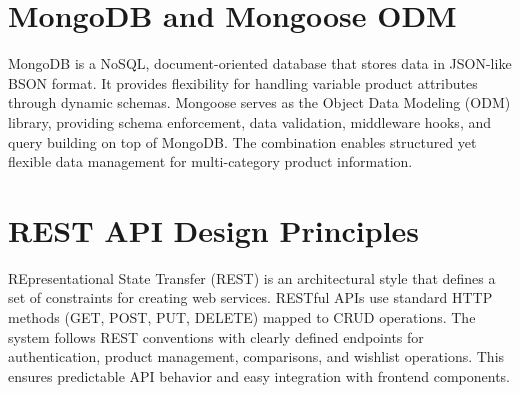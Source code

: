 \section{MongoDB and Mongoose ODM}
MongoDB is a NoSQL, document-oriented database that stores data in JSON-like BSON format. It provides flexibility for handling variable product attributes through dynamic schemas. Mongoose serves as the Object Data Modeling (ODM) library, providing schema enforcement, data validation, middleware hooks, and query building on top of MongoDB. The combination enables structured yet flexible data management for multi-category product information.

\section{REST API Design Principles}
REpresentational State Transfer (REST) is an architectural style that defines a set of constraints for creating web services. RESTful APIs use standard HTTP methods (GET, POST, PUT, DELETE) mapped to CRUD operations. The system follows REST conventions with clearly defined endpoints for authentication, product management, comparisons, and wishlist operations. This ensures predictable API behavior and easy integration with frontend components.